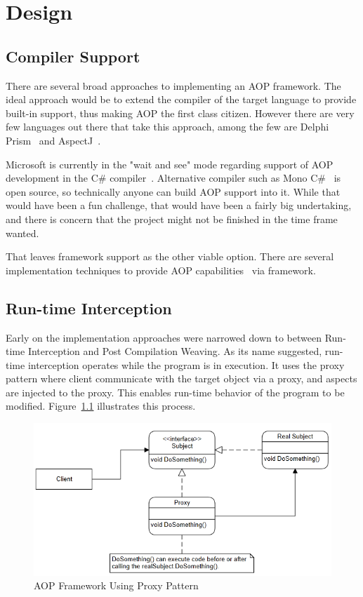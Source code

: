 \chapter{Design}

\section{Compiler Support}

There are several broad approaches to implementing an AOP framework. The ideal approach would be to extend the compiler of the target language to provide built-in support, thus making AOP the first class citizen. However there are very few languages out there that take this approach, among the few are Delphi Prism~\cite{delphi_prism2010} and AspectJ~\cite{aspectj_faq, aspectj_text}. 

Microsoft is currently in the "wait and see" mode regarding support of AOP development in the C\# compiler~\cite{hejlsberg}. Alternative compiler such as Mono C\#~\cite{monocsharp} is open source, so technically anyone can build AOP support into it. While that would have been a fun challenge, that would have been a fairly big undertaking, and there is concern that the project might not be finished in the time frame wanted.

That leaves framework support as the other viable option. There are several implementation techniques to provide AOP capabilities~\cite{aopcs, postsharp, aspectcs} via framework.

\section{Run-time Interception}

Early on the implementation approaches were narrowed down to between Run-time Interception and Post Compilation Weaving. As its name suggested, run-time interception operates while the program is in execution. It uses the proxy pattern where client communicate with the target object via a proxy, and aspects are injected to the proxy. This enables run-time behavior of the program to be modified. Figure~\ref{proxy_model} illustrates this process.

\begin{figure}[H]
  \includegraphics[scale=1.0]{Proxy3.PNG}
  \centering
  \caption{AOP Framework Using Proxy Pattern\label{proxy_model}}
\end{figure}


